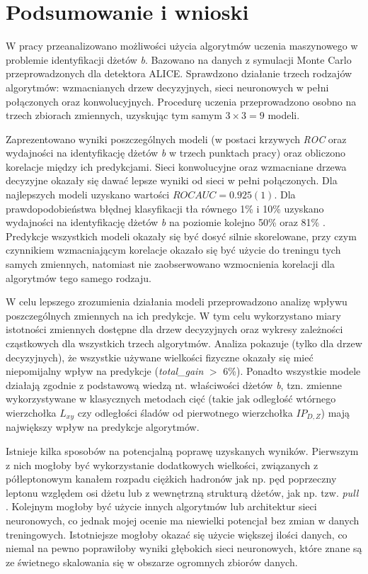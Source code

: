 \section{Podsumowanie i wnioski}
\label{sec:podsumowanie}

W pracy przeanalizowano możliwości użycia algorytmów uczenia maszynowego w problemie identyfikacji dżetów \textit{b}.
Bazowano na danych z symulacji Monte Carlo przeprowadzonych dla detektora ALICE.
Sprawdzono działanie trzech rodzajów algorytmów: wzmacnianych drzew decyzyjnych, sieci neuronowych w pełni połączonych oraz konwolucyjnych.
Procedurę uczenia przeprowadzono osobno na trzech zbiorach zmiennych, uzyskując tym samym $3\times3=9$ modeli. 

Zaprezentowano wyniki poszczególnych modeli (w postaci krzywych \textit{ROC} oraz wydajności na identyfikację  dżetów \textit{b} w trzech punktach pracy) oraz obliczono korelacje między ich predykcjami.
Sieci konwolucyjne oraz wzmacniane drzewa decyzyjne okazały się dawać lepsze wyniki od sieci w pełni połączonych.
Dla najlepszych modeli uzyskano wartości $ROC AUC = 0.925(1)$.
Dla prawdopodobieństwa błędnej klasyfikacji tła równego 1\% i 10\% uzyskano wydajności na identyfikację dżetów \textit{b} na poziomie kolejno 50\% oraz 81\% .
Predykcje wszystkich modeli okazały się być dosyć silnie skorelowane, przy czym czynnikiem wzmacniającym korelacje okazało się być użycie do treningu tych samych zmiennych, natomiast nie zaobserwowano wzmocnienia korelacji dla algorytmów tego samego rodzaju.

W celu lepszego zrozumienia działania modeli przeprowadzono analizę wpływu poszczególnych zmiennych na ich predykcje. W tym celu wykorzystano miary istotności zmiennych dostępne dla drzew decyzyjnych oraz wykresy zależności cząstkowych dla wszystkich trzech algorytmów.
Analiza pokazuje (tylko dla drzew decyzyjnych), że wszystkie używane wielkości fizyczne okazały się mieć niepomijalny wpływ na predykcje (\textit{total\_gain} $>$ 6\%).
Ponadto wszystkie modele działają zgodnie z podstawową wiedzą nt. właściwości dżetów \textit{b}, tzn. zmienne wykorzystywane w klasycznych metodach cięć (takie jak odległość wtórnego wierzchołka $L_{xy}$ czy odległości śladów od pierwotnego wierzchołka $IP_{D,Z}$) mają największy wpływ na predykcje algorytmów. 

Istnieje kilka sposobów na potencjalną poprawę uzyskanych wyników. 
Pierwszym z nich mogłoby być wykorzystanie dodatkowych wielkości, związanych z półleptonowym kanałem rozpadu ciężkich hadronów jak np. pęd poprzeczny leptonu względem osi dżetu lub z wewnętrzną strukturą dżetów, jak np. tzw. \textit{pull} \cite{Gallicchio:2010sw}. 
Kolejnym mogłoby być użycie innych algorytmów lub architektur sieci neuronowych, co jednak mojej ocenie ma niewielki potencjał bez zmian w danych treningowych.
Istotniejsze mogłoby okazać się użycie większej ilości danych, co niemal na pewno poprawiłoby wyniki głębokich sieci neuronowych, które znane są ze świetnego skalowania się w obszarze ogromnych zbiorów danych.

